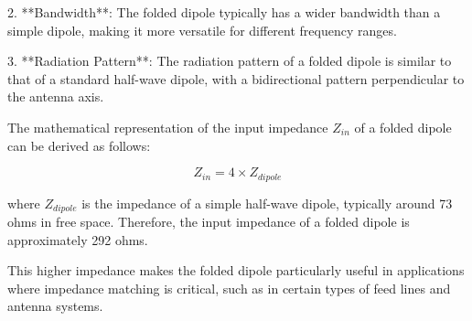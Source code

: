 2. **Bandwidth**: The folded dipole typically has a wider bandwidth than a simple dipole, making it more versatile for different frequency ranges.

3. **Radiation Pattern**: The radiation pattern of a folded dipole is similar to that of a standard half-wave dipole, with a bidirectional pattern perpendicular to the antenna axis.

The mathematical representation of the input impedance \( Z_{in} \) of a folded dipole can be derived as follows:

\[
Z_{in} = 4 \times Z_{dipole}
\]

where \( Z_{dipole} \) is the impedance of a simple half-wave dipole, typically around 73 ohms in free space. Therefore, the input impedance of a folded dipole is approximately 292 ohms.

This higher impedance makes the folded dipole particularly useful in applications where impedance matching is critical, such as in certain types of feed lines and antenna systems.

